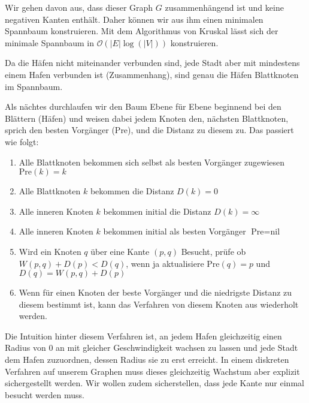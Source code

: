 \documentclass[parskip=half,a4paper]{scrartcl}
\begin{document}
Wir gehen davon aus, dass dieser Graph $G$ zusammenhängend ist und keine negativen Kanten enthält. Daher können wir aus ihm einen minimalen Spannbaum konstruieren. Mit dem Algorithmus von Kruskal lässt sich der minimale Spannbaum in \(\mathcal{O}(|E|\log(|V|))\) konstruieren.

Da die Häfen nicht miteinander verbunden sind, jede Stadt aber mit mindestens einem Hafen verbunden ist (Zusammenhang), sind genau die Häfen Blattknoten im Spannbaum.

Als nächtes durchlaufen wir den Baum Ebene für Ebene beginnend bei den Blättern (Häfen) und weisen dabei jedem Knoten den, nächsten Blattknoten, sprich den besten Vorgänger ($\text{Pre}$), und die Distanz zu diesem zu. Das passiert wie folgt:

\begin{enumerate}
    \item Alle Blattknoten bekommen sich selbst als besten Vorgänger zugewiesen $\text{Pre}(k) = k$
    \item Alle Blattknoten $k$ bekommen die Distanz $D(k) = 0$
    \item Alle inneren Knoten $k$ bekommen initial die Distanz $D(k) = \infty$
    \item Alle inneren Knoten $k$ bekommen initial als besten Vorgänger $\text{Pre} = \text{nil}$
    \item Wird ein Knoten $q$ über eine Kante $(p,q)$ Besucht, prüfe ob $W(p,q) + D(p) < D(q)$, wenn ja aktualisiere $\text{Pre}(q) = p$ und $D(q) = W(p,q) + D(p)$
    \item Wenn für einen Knoten der beste Vorgänger und die niedrigste Distanz zu diesem bestimmt ist, kann das Verfahren von diesem Knoten aus wiederholt werden.
\end{enumerate}

Die Intuition hinter diesem Verfahren ist, an jedem Hafen gleichzeitig einen Radius von 0 an mit gleicher Geschwindigkeit wachsen zu lassen und jede Stadt dem Hafen zuzuordnen, dessen Radius sie zu erst erreicht. In einem diskreten Verfahren auf unserem Graphen muss dieses gleichzeitig Wachstum aber explizit sichergestellt werden. Wir wollen zudem sicherstellen, dass jede Kante nur einmal besucht werden muss.
\end{document}
